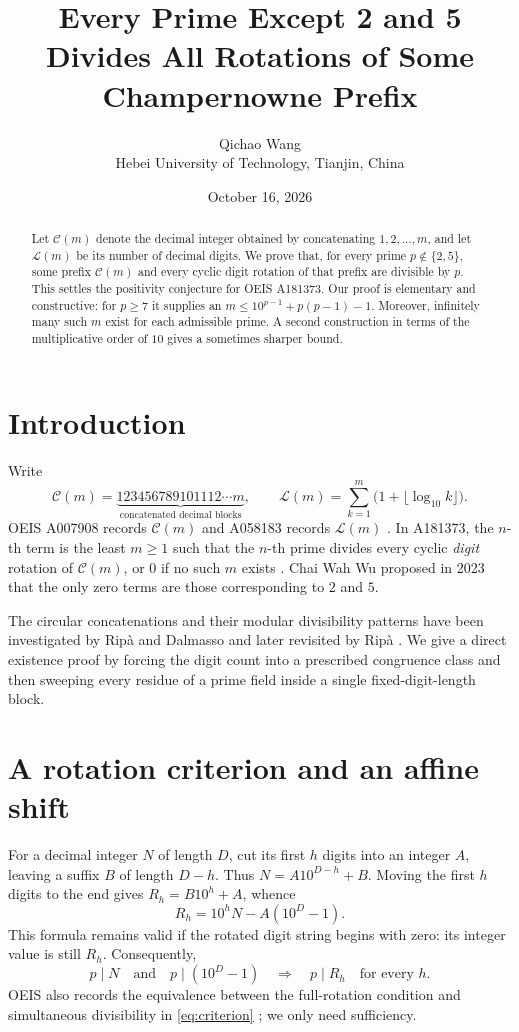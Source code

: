 \documentclass[10pt]{article}
\title{Every Prime Except 2 and 5 Divides All Rotations of Some Champernowne Prefix}
\author{Qichao Wang\\\small Hebei University of Technology, Tianjin, China}
\date{October 16, 2026}
\newcommand{\Cham}{\mathcal{C}}
\newcommand{\len}{\mathcal{L}}
\begin{document}
\maketitle
\begin{abstract}
Let $\Cham(m)$ denote the decimal integer obtained by concatenating
$1,2,\ldots,m$, and let $\len(m)$ be its number of decimal digits.
We prove that, for every prime $p\notin\{2,5\}$, some prefix $\Cham(m)$
and every cyclic digit rotation of that prefix are divisible by $p$.
This settles the positivity conjecture for OEIS A181373.
Our proof is elementary and constructive: for $p\ge7$ it supplies an
$m\le 10^{p-1}+p(p-1)-1$. Moreover, infinitely many such $m$ exist
for each admissible prime. A second construction in terms of the
multiplicative order of $10$ gives a sometimes sharper bound.
\end{abstract}

\section{Introduction}
Write
\[
  \Cham(m)=\underbrace{123456789101112\cdots m}_{\text{concatenated decimal blocks}},
  \qquad
  \len(m)=\sum_{k=1}^{m}\bigl(1+\lfloor\log_{10}k\rfloor\bigr).
\]
OEIS A007908 records $\Cham(m)$ and A058183 records $\len(m)$
\cite{oeis7908,oeis58183}. In A181373, the $n$-th term is the least
$m\ge1$ such that the $n$-th prime divides every cyclic \emph{digit}
rotation of $\Cham(m)$, or $0$ if no such $m$ exists
\cite{oeis181373}. Chai Wah Wu proposed in 2023 that the only zero
terms are those corresponding to $2$ and $5$.

The circular concatenations and their modular divisibility patterns
have been investigated by Rip\`a and Dalmasso \cite{ripa-dalmasso}
and later revisited by Rip\`a \cite{ripa-note}. We give a direct
existence proof by forcing the digit count into a prescribed congruence
class and then sweeping every residue of a prime field inside a single
fixed-digit-length block.

\section{A rotation criterion and an affine shift}
For a decimal integer $N$ of length $D$, cut its first $h$ digits into
an integer $A$, leaving a suffix $B$ of length $D-h$. Thus
$N=A10^{D-h}+B$. Moving the first $h$ digits to the end gives
$R_h=B10^h+A$, whence
\begin{equation}\label{eq:rotation}
  R_h=10^hN-A(10^D-1).
\end{equation}
This formula remains valid if the rotated digit string begins with zero:
its integer value is still $R_h$.
Consequently,
\begin{equation}\label{eq:criterion}
   p\mid N\quad\text{and}\quad p\mid(10^D-1)
   \quad\Longrightarrow\quad
   p\mid R_h\quad\text{for every }h.
\end{equation}
OEIS also records the equivalence between the full-rotation condition
and simultaneous divisibility in \eqref{eq:criterion}
\cite{oeis181373}; we only need sufficiency.
\end{document}
